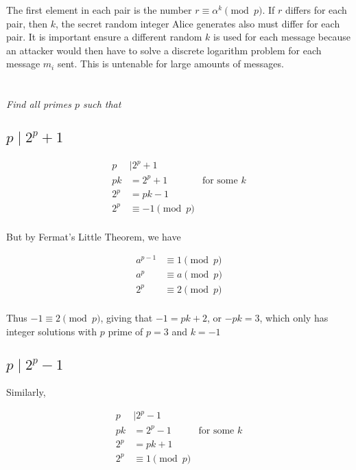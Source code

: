 \documentclass[12pt]{article}
\begin{document}
    The first element in each pair is the number $r \equiv \alpha^k \pmod{p}$. If $r$ differs for each pair, then $k$, the secret random integer Alice generates also must differ for each pair. It is important ensure a different random $k$ is used for each message because an attacker would then have to solve a discrete logarithm problem for each message $m_i$ sent. This is untenable for large amounts of messages.

\newpage

\section{} \textit{Find all primes $p$ such that}

    \subsection{$p \mid 2^p + 1$}

        \begin{align*}
            p &\mid 2^p + 1\\
            pk &= 2^p + 1 &\text{for some $k$}\\
            2^p &= pk - 1\\
            2^p &\equiv -1 \pmod{p}\\
        \end{align*}

        But by Fermat's Little Theorem, we have

        \begin{align*}
            a^{p - 1} &\equiv 1 \pmod{p}\\
            a^p &\equiv a \pmod{p}\\
            2^p &\equiv 2 \pmod{p}\\
        \end{align*}

        Thus $-1 \equiv 2 \pmod{p}$, giving that $-1 = pk + 2$, or $-pk = 3$, which only has integer solutions with $p$ prime of $p=3$ and $k=-1$

    \subsection{$p \mid 2^p - 1$}

        Similarly,

        \begin{align*}
            p &\mid 2^p - 1\\
            pk &= 2^p - 1 &\text{for some $k$}\\
            2^p &= pk + 1\\
            2^p &\equiv 1 \pmod{p}\\
        \end{align*}
\end{document}
